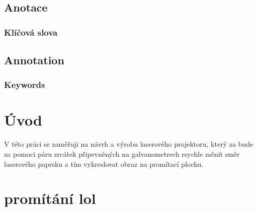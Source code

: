 \documentclass{template/socthesis}
\author{Šimon Hrouda}
\begin{document}
\maketitle



\pagestyle{empty}

\section*{Anotace}


\subsection*{Klíčová slova}


\vspace{20mm}

\section*{Annotation}


\subsection*{Keywords}


\newpage
\pagestyle{plain}

\tableofcontents %

\setcounter{figure}{0}
\setcounter{table}{0}
\newpage

\chapter*{Úvod}
V této práci se zaměřuji na návrh a výrobu laserového projektoru, který za bude za pomoci páru zrcátek připevněných na galvanometrech rsychle měnit směr laserového paprsku a tím vykreslovat obraz na promítací plochu.


\newpage
\chapter{promítání lol}
\end{document}
